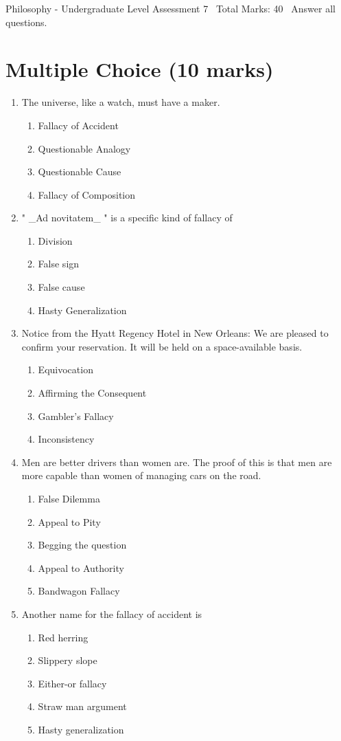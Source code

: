\documentclass[12pt]{article}
\begin{document}
\begin{center}
Philosophy - Undergraduate Level Assessment 7 \
Total Marks: 40 \
Answer all questions.
\end{center}

\section*{Multiple Choice (10 marks)}
\begin{enumerate}[label=\arabic*.]
\item The universe, like a watch, must have a maker.
\begin{enumerate}[label=(\alph*)]
    \item Fallacy of Accident
    \item Questionable Analogy
    \item Questionable Cause
    \item Fallacy of Composition
\end{enumerate}
\item " \_Ad novitatem\_ " is a specific kind of fallacy of
\begin{enumerate}[label=(\alph*)]
    \item Division
    \item False sign
    \item False cause
    \item Hasty Generalization
\end{enumerate}
\item Notice from the Hyatt Regency Hotel in New Orleans: We are pleased to confirm your reservation. It will be held on a space-available basis.
\begin{enumerate}[label=(\alph*)]
    \item Equivocation
    \item Affirming the Consequent
    \item Gambler's Fallacy
    \item Inconsistency
\end{enumerate}
\item Men are better drivers than women are. The proof of this is that men are more capable than women of managing cars on the road.
\begin{enumerate}[label=(\alph*)]
    \item False Dilemma
    \item Appeal to Pity
    \item Begging the question
    \item Appeal to Authority
    \item Bandwagon Fallacy
\end{enumerate}
\item Another name for the fallacy of accident is
\begin{enumerate}[label=(\alph*)]
    \item Red herring
    \item Slippery slope
    \item Either-or fallacy
    \item Straw man argument
    \item Hasty generalization
\end{enumerate}
\end{enumerate}
\end{document}
